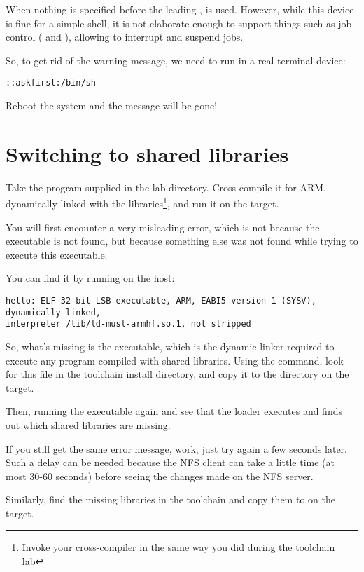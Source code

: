 When nothing is specified before the leading \code{::}, 
is used. However, while this device is fine for a simple shell, it is
not elaborate enough to support things such as job control
(\code{[Ctrl][c]} and \code{[Ctrl][z]}), allowing to interrupt and
suspend jobs.

So, to get rid of the warning message, we need  to run
 in a real terminal device:

{\tt \ttyname::askfirst:/bin/sh}

Reboot the system and the message will be gone!

\section{Switching to shared libraries}

Take the  program supplied in the lab 
directory. Cross-compile it for ARM, dynamically-linked with the
libraries\footnote{Invoke your cross-compiler in the same way you
did during the toolchain lab}, and run it on the target.

You will first encounter a very misleading  error,
which is not because the  executable is not found, but
because something else was not found while trying to execute
this executable.

You can find it by running  on the host:

\begin{verbatim}
hello: ELF 32-bit LSB executable, ARM, EABI5 version 1 (SYSV), dynamically linked,
interpreter /lib/ld-musl-armhf.so.1, not stripped
\end{verbatim}

So, what's missing is the 
executable, which is the dynamic linker required to execute any
program compiled with shared libraries. Using the 
command, look for this file in the toolchain install directory,
and copy it to the  directory on the target.

Then, running the executable again and see that the loader executes
and finds out which shared libraries are missing.

If you still get the same error message, work, just try again a
few seconds later.  Such a delay can be needed because the NFS
client can take a little time (at most 30-60 seconds) before
seeing the changes made on the NFS server.

Similarly, find the missing libraries in the toolchain and copy
them to  on the target.


